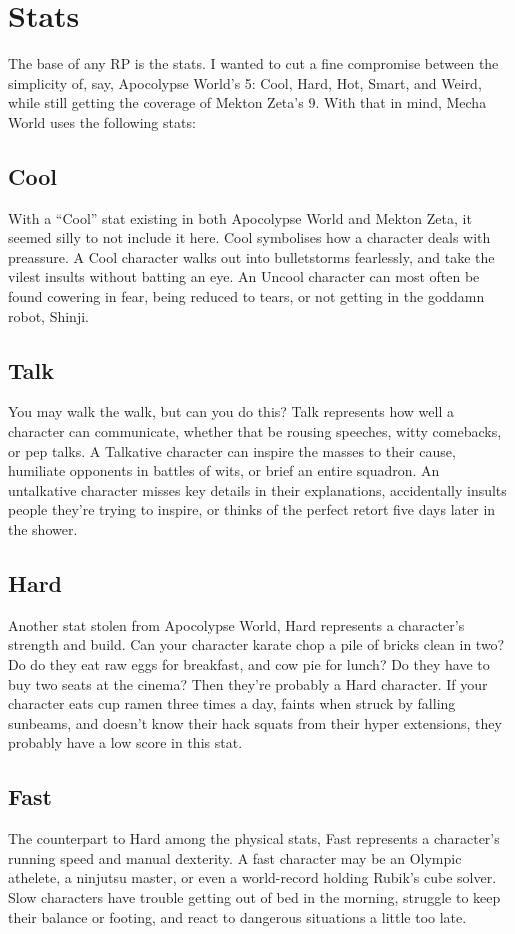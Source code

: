\section{Stats}
The base of any RP is the stats. I wanted to cut a fine compromise between the simplicity of, say, Apocolypse World's 5: Cool, Hard, Hot, Smart, and Weird, while still getting the coverage of Mekton Zeta's 9. With that in mind, Mecha World uses the following stats:

\subsection{Cool}
With a ``Cool'' stat existing in both Apocolypse World and Mekton Zeta, it seemed silly to not include it here. Cool symbolises how a character deals with preassure. A Cool character walks out into bulletstorms fearlessly, and take the vilest insults without batting an eye. An Uncool character can most often be found cowering in fear, being reduced to tears, or not getting in the goddamn robot, Shinji.
 
\subsection{Talk}
You may walk the walk, but can you do this? Talk represents how well a character can communicate, whether that be rousing speeches, witty comebacks, or pep talks. A Talkative character can inspire the masses to their cause, humiliate opponents in battles of wits, or brief an entire squadron. An untalkative character misses key details in their explanations, accidentally insults people they're trying to inspire, or thinks of the perfect retort five days later in the shower.

\subsection{Hard}
Another stat stolen from Apocolypse World, Hard represents a character's strength and build. Can your character karate chop a pile of bricks clean in two? Do do they eat raw eggs for breakfast, and cow pie for lunch? Do they have to buy two seats at the cinema? Then they're probably a Hard character. If your character eats cup ramen three times a day, faints when struck by falling sunbeams, and doesn't know their hack squats from their hyper extensions, they probably have a low score in this stat.

\subsection{Fast}
The counterpart to Hard among the physical stats, Fast represents a character's running speed and manual dexterity. A fast character may be an Olympic athelete, a ninjutsu master, or even a world-record holding Rubik's cube solver. Slow characters have trouble getting out of bed in the morning, struggle to keep their balance or footing, and react to dangerous situations a little too late.

